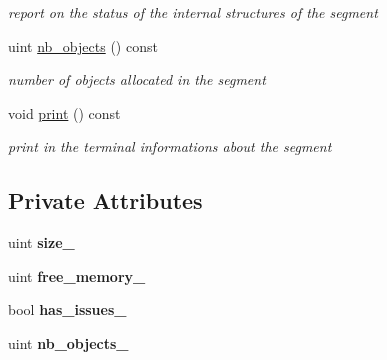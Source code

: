 \begin{DoxyCompactItemize}
\begin{DoxyCompactList}\small\item\em report on the status of the internal structures of the segment \end{DoxyCompactList}\item 
\mbox{\label{classshared__memory_1_1SegmentInfo_a0476820df56c71f90620324a41ee75e0}} 
uint \hyperlink{classshared__memory_1_1SegmentInfo_a0476820df56c71f90620324a41ee75e0}{nb\+\_\+objects} () const
\begin{DoxyCompactList}\small\item\em number of objects allocated in the segment \end{DoxyCompactList}\item 
\mbox{\label{classshared__memory_1_1SegmentInfo_abdd9baf28cb58a647668dcafa48ba28e}} 
void \hyperlink{classshared__memory_1_1SegmentInfo_abdd9baf28cb58a647668dcafa48ba28e}{print} () const
\begin{DoxyCompactList}\small\item\em print in the terminal informations about the segment \end{DoxyCompactList}\end{DoxyCompactItemize}
\subsection*{Private Attributes}
\begin{DoxyCompactItemize}
\item 
\mbox{\label{classshared__memory_1_1SegmentInfo_a87f1d90b4bfefd07945ba0e7d42959f4}} 
uint {\bfseries size\+\_\+}
\item 
\mbox{\label{classshared__memory_1_1SegmentInfo_ab1b9e3b023e45ccb327e7322d9dde554}} 
uint {\bfseries free\+\_\+memory\+\_\+}
\item 
\mbox{\label{classshared__memory_1_1SegmentInfo_a727ff0d1a39302da90b26207de2ffc26}} 
bool {\bfseries has\+\_\+issues\+\_\+}
\item 
\mbox{\label{classshared__memory_1_1SegmentInfo_a56992f58b9b7c0bebbbff56d85a95a4b}} 
uint {\bfseries nb\+\_\+objects\+\_\+}
\end{DoxyCompactItemize}



